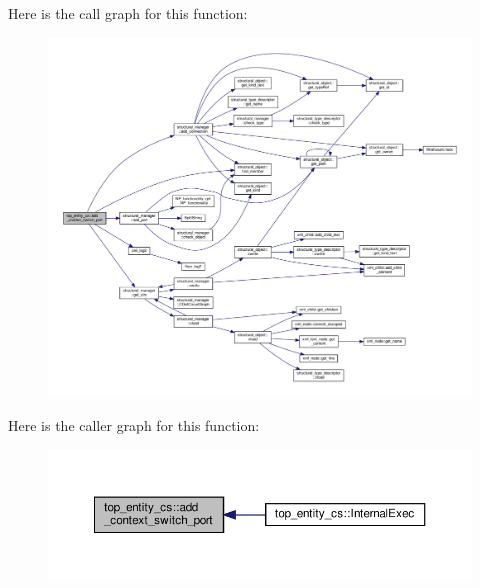 Here is the call graph for this function\+:
\nopagebreak
\begin{figure}[H]
\begin{center}
\leavevmode
\includegraphics[width=350pt]{d5/d78/classtop__entity__cs_a4c457699245092dbe20fe8f2cb1e223d_cgraph}
\end{center}
\end{figure}
Here is the caller graph for this function\+:
\nopagebreak
\begin{figure}[H]
\begin{center}
\leavevmode
\includegraphics[width=350pt]{d5/d78/classtop__entity__cs_a4c457699245092dbe20fe8f2cb1e223d_icgraph}
\end{center}
\end{figure}
\mbox{\label{classtop__entity__cs_a19522f640bbc667757f9ad40166e879f}} 
